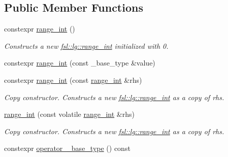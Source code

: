 \subsection*{Public Member Functions}
\begin{DoxyCompactItemize}
\item 
\mbox{\label{classfsl_1_1lg_1_1range__int_aacbeffb650b96757b22f752d46c887b4}} 
constexpr \mbox{\hyperlink{classfsl_1_1lg_1_1range__int_aacbeffb650b96757b22f752d46c887b4}{range\+\_\+int}} ()
\begin{DoxyCompactList}\small\item\em Constructs a new \mbox{\hyperlink{classfsl_1_1lg_1_1range__int}{fsl\+::lg\+::range\+\_\+int}} initialized with 0. \end{DoxyCompactList}\item 
constexpr \mbox{\hyperlink{classfsl_1_1lg_1_1range__int_a1a1400253adfd449299c41cea331ee61}{range\+\_\+int}} (const \+\_\+base\+\_\+type \&value)
\item 
\mbox{\label{classfsl_1_1lg_1_1range__int_ac94eba99f33ff5f811ed046f148f51b0}} 
constexpr \mbox{\hyperlink{classfsl_1_1lg_1_1range__int_ac94eba99f33ff5f811ed046f148f51b0}{range\+\_\+int}} (const \mbox{\hyperlink{classfsl_1_1lg_1_1range__int}{range\+\_\+int}} \&rhs)
\begin{DoxyCompactList}\small\item\em Copy constructor. Constructs a new \mbox{\hyperlink{classfsl_1_1lg_1_1range__int}{fsl\+::lg\+::range\+\_\+int}} as a copy of {\itshape rhs}. \end{DoxyCompactList}\item 
\mbox{\label{classfsl_1_1lg_1_1range__int_a03fab3b7204b1c251acb6053d72181ac}} 
\mbox{\hyperlink{classfsl_1_1lg_1_1range__int_a03fab3b7204b1c251acb6053d72181ac}{range\+\_\+int}} (const volatile \mbox{\hyperlink{classfsl_1_1lg_1_1range__int}{range\+\_\+int}} \&rhs)
\begin{DoxyCompactList}\small\item\em Copy constructor. Constructs a new \mbox{\hyperlink{classfsl_1_1lg_1_1range__int}{fsl\+::lg\+::range\+\_\+int}} as a copy of {\itshape rhs}. \end{DoxyCompactList}\item 
constexpr \mbox{\hyperlink{classfsl_1_1lg_1_1range__int_a08cd60e0694d2a7a29d86221dc6a702b}{operator \+\_\+base\+\_\+type}} () const

\end{DoxyCompactItemize}
